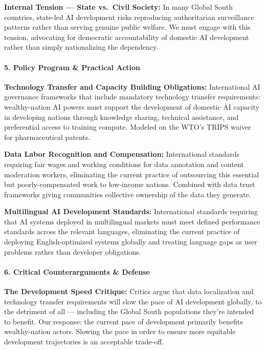 \textbf{Internal Tension --- State vs.~Civil Society:} In many Global
South countries, state-led AI development risks reproducing
authoritarian surveillance patterns rather than serving genuine public
welfare. We must engage with this tension, advocating for democratic
accountability of domestic AI development rather than simply
nationalizing the dependency.

\paragraph{5. Policy Program \& Practical
Action}\label{policy-program-practical-action-44}

\textbf{Technology Transfer and Capacity Building Obligations:}
International AI governance frameworks that include mandatory technology
transfer requirements: wealthy-nation AI powers must support the
development of domestic AI capacity in developing nations through
knowledge sharing, technical assistance, and preferential access to
training compute. Modeled on the WTO's TRIPS waiver for pharmaceutical
patents.

\textbf{Data Labor Recognition and Compensation:} International
standards requiring fair wages and working conditions for data
annotation and content moderation workers, eliminating the current
practice of outsourcing this essential but poorly-compensated work to
low-income nations. Combined with data trust frameworks giving
communities collective ownership of the data they generate.

\textbf{Multilingual AI Development Standards:} International standards
requiring that AI systems deployed in multilingual markets must meet
defined performance standards across the relevant languages, eliminating
the current practice of deploying English-optimized systems globally and
treating language gaps as user problems rather than developer
obligations.

\paragraph{6. Critical Counterarguments \&
Defense}\label{critical-counterarguments-defense-44}

\textbf{The Development Speed Critique:} Critics argue that data
localization and technology transfer requirements will slow the pace of
AI development globally, to the detriment of all --- including the
Global South populations they're intended to benefit. Our response: the
current pace of development primarily benefits wealthy-nation actors.
Slowing the pace in order to ensure more equitable development
trajectories is an acceptable trade-off.

